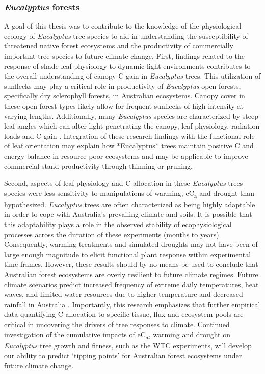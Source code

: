 \documentclass[a4paper]{article}
\begin{document}
\subsubsection*{\textit{Eucalyptus} forests}
A goal of this thesis was to contribute to the knowledge of the physiological ecology of \textit{Eucalyptus} tree species to aid in understanding the susceptibility of threatened native forest ecosystems and the productivity of commercially important tree species to future climate change. First, findings related to the response of shade leaf physiology to dynamic light environments contributes to the overall understanding of canopy C gain in \textit{Eucalyptus} trees. This utilization of sunflecks may play a critical role in productivity of \textit{Eucalyptus} open-forests, specifically dry sclerophyll forests, in Australian ecosystems. Canopy cover in these open forest types likely allow for frequent sunflecks of high intensity at varying lengths. Additionally, many \textit{Eucalyptus} species are characterized by steep leaf angles which can alter light penetrating the canopy, leaf physiology, radiation loads and C gain \citep{cowan1981coping, king1997functional, james2000leaf, falster2003leaf}. Integration of these research findings with the functional role of leaf orientation may explain how *Eucalyptus* trees maintain positive C and energy balance in resource poor ecosystems and may be applicable to improve commercial stand productivity through thinning or pruning.

Second, aspects of leaf physiology and C allocation in these \textit{Eucalyptus} trees species were less sensitivity to manipulations of warming, eC\textsubscript{a} and drought than hypothesized. \textit{Eucalyptus} trees are often characterized as being highly adaptable in order to cope with Australia’s prevailing climate and soils. It is possible that this adaptability plays a role in the observed stability of ecophysiological processes across the duration of these experiments (months to years). Consequently, warming treatments and simulated droughts may not have been of large enough magnitude to elicit functional plant response within experimental time frames. However, these results should by no means be used to conclude that Australian forest ecosystems are overly resilient to future climate regimes. Future climate scenarios predict increased frequency of extreme daily temperatures, heat waves, and limited water resources due to higher temperature and decreased rainfall in Australia \citep{ipcc2014}. Importantly, this research emphasizes that further empirical data quantifying C allocation to specific tissue, flux and ecosystem pools are critical in uncovering the drivers of tree responses to climate. Continued investigation of the cumulative impacts of eC\textsubscript{a}, warming and drought on \textit{Eucalyptus} tree growth and fitness, such as the WTC experiments, will develop our ability to predict ‘tipping points’ for Australian forest ecosystems under future climate change.
\end{document}

